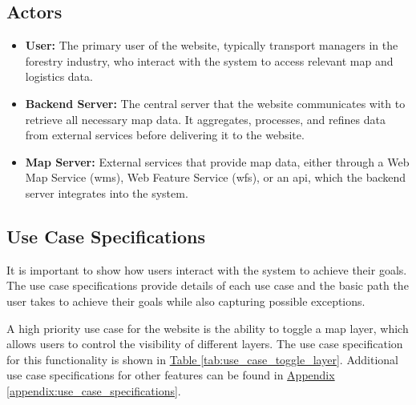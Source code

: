\subsection{Actors}

\begin{itemize}
    \item \textbf{User:} The primary user of the website, typically transport managers in the forestry industry, who interact with the system to access relevant map and logistics data.
    \item \textbf{Backend Server:} The central server that the website communicates with to retrieve all necessary map data. It aggregates, processes, and refines data from external services before delivering it to the website.
    \item \textbf{Map Server:} External services that provide map data, either through a Web Map Service (\Gls{wms}), Web Feature Service (\Gls{wfs}), or an \acrshort{api}, which the backend server integrates into the system.
\end{itemize}

\subsection{Use Case Specifications}

It is important to show how users interact with the system to achieve their goals. The use case specifications provide details of each use case and the basic path the user takes to achieve their goals while also capturing possible exceptions. 

A high priority use case for the website is the ability to toggle a map layer, which allows users to control the visibility of different layers. The use case specification for this functionality is shown in \hyperref[tab:use_case_toggle_layer]{Table \ref*{tab:use_case_toggle_layer}}. Additional use case specifications for other features can be found in \hyperref[appendix:use_case_specifications]{Appendix \ref*{appendix:use_case_specifications}}.


